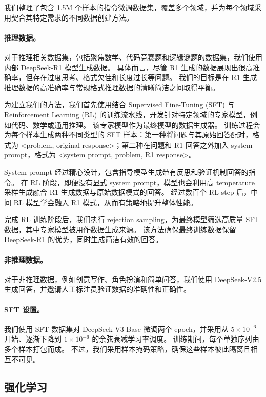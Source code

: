\documentclass[11pt, a4paper, logo, copyright, nonumbering]{deepseek}
\newcommand{\dsviii}{DeepSeek-V3}
\begin{document}
我们整理了包含 1.5M 个样本的指令微调数据集，覆盖多个领域，并为每个领域采用契合其特定需求的不同数据创建方法。

\paragraph{推理数据。}
对于推理相关数据集，包括聚焦数学、代码竞赛题和逻辑谜题的数据集，我们使用内部 DeepSeek-R1 模型生成数据。
具体而言，尽管 R1 生成的数据展现出很高准确率，但存在过度思考、格式欠佳和长度过长等问题。
我们的目标是在 R1 生成推理数据的高准确率与常规格式推理数据的清晰简洁之间取得平衡。

为建立我们的方法，我们首先使用结合 Supervised Fine-Tuning (SFT) 与 Reinforcement Learning (RL) 的训练流水线，开发针对特定领域的专家模型，例如代码、数学或通用推理。
该专家模型作为最终模型的数据生成器。
训练过程会为每个样本生成两种不同类型的 SFT 样本：第一种将问题与其原始回答配对，格式为 <problem, original response>；第二种在问题和 R1 回答之外加入 system prompt，格式为 <system prompt, problem, R1 response>。

System prompt 经过精心设计，包含指导模型生成带有反思和验证机制回答的指令。
在 RL 阶段，即便没有显式 system prompt，模型也会利用高 temperature 采样生成融合 R1 生成数据与原始数据模式的回答。
经过数百个 RL step 后，中间 RL 模型学会融入 R1 模式，从而有策略地提升整体性能。

完成 RL 训练阶段后，我们执行 rejection sampling，为最终模型筛选高质量 SFT 数据，其中专家模型被用作数据生成来源。
该方法确保最终训练数据保留 DeepSeek-R1 的优势，同时生成简洁有效的回答。

\paragraph{非推理数据。}
对于非推理数据，例如创意写作、角色扮演和简单问答，我们使用 DeepSeek-V2.5 生成回答，并邀请人工标注员验证数据的准确性和正确性。

\paragraph{SFT 设置。}
我们使用 SFT 数据集对 \dsviii{}-Base 微调两个 epoch，并采用从 $5 \times 10^{-6}$ 开始、逐渐下降到 $1 \times 10^{-6}$ 的余弦衰减学习率调度。
训练期间，每个单独序列由多个样本打包而成。
不过，我们采用样本掩码策略，确保这些样本彼此隔离且相互不可见。

\subsection{强化学习}
\end{document}
